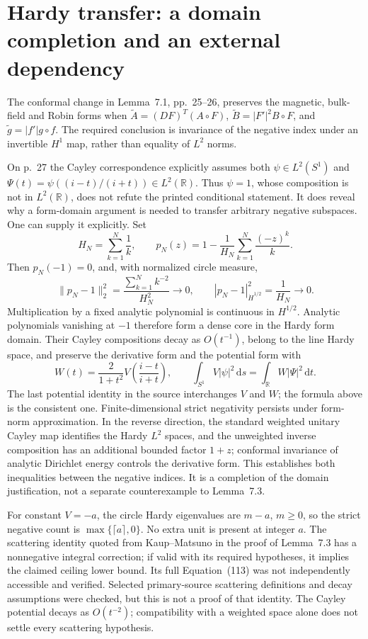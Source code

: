\documentclass[10pt]{article}
\begin{document}
\section*{Hardy transfer: a domain completion and an external dependency}
The conformal change in Lemma 7.1, pp. 25–26, preserves the magnetic, bulk-field and Robin forms when \(\widetilde A=(DF)^T(A\circ F)\), \(\widetilde B=|F'|^2B\circ F\), and \(\widetilde g=|f'|g\circ f\). The required conclusion is invariance of the negative index under an invertible \(H^1\) map, rather than equality of \(L^2\) norms.\par
On p. 27 the Cayley correspondence explicitly assumes both \(\psi\in L^2(S^1)\) and \(\Psi(t)=\psi((i-t)/(i+t))\in L^2(\mathbb R)\). Thus \(\psi=1\), whose composition is not in \(L^2(\mathbb R)\), does not refute the printed conditional statement. It does reveal why a form-domain argument is needed to transfer arbitrary negative subspaces. One can supply it explicitly. Set \[H_N=\sum_{k=1}^{N}\frac1k,\qquad
 p_N(z)=1-\frac1{H_N}\sum_{k=1}^{N}\frac{(-z)^k}{k}.\] Then \(p_N(-1)=0\), and, with normalized circle measure, \[\|p_N-1\|_2^2=\frac{\sum_{k=1}^{N}k^{-2}}{H_N^2}\longrightarrow0,
 \qquad |p_N-1|_{\dot H^{1/2}}^2=\frac1{H_N}\longrightarrow0.\] Multiplication by a fixed analytic polynomial is continuous in \(H^{1/2}\). Analytic polynomials vanishing at \(-1\) therefore form a dense core in the Hardy form domain. Their Cayley compositions decay as \(O(t^{-1})\), belong to the line Hardy space, and preserve the derivative form and the potential form with \[W(t)=\frac{2}{1+t^2}V\!\left(\frac{i-t}{i+t}\right),\qquad
 \int_{S^1}V|\psi|^2\,\mathrm ds=\int_\mathbb RW|\Psi|^2\,\mathrm dt .\] The last potential identity in the source interchanges \(V\) and \(W\); the formula above is the consistent one. Finite-dimensional strict negativity persists under form-norm approximation. In the reverse direction, the standard weighted unitary Cayley map identifies the Hardy \(L^2\) spaces, and the unweighted inverse composition has an additional bounded factor \(1+z\); conformal invariance of analytic Dirichlet energy controls the derivative form. This establishes both inequalities between the negative indices. It is a completion of the domain justification, not a separate counterexample to Lemma 7.3.\par
For constant \(V=-a\), the circle Hardy eigenvalues are \(m-a\), \(m\geq0\), so the strict negative count is \(\max\{\lceil a\rceil,0\}\). No extra unit is present at integer \(a\). The scattering identity quoted from Kaup–Matsuno in the proof of Lemma 7.3 has a nonnegative integral correction; if valid with its required hypotheses, it implies the claimed ceiling lower bound. Its full Equation (113) was not independently accessible and verified. Selected primary-source scattering definitions and decay assumptions were checked, but this is not a proof of that identity. The Cayley potential decays as \(O(t^{-2})\); compatibility with a weighted space alone does not settle every scattering hypothesis.\par
\end{document}

